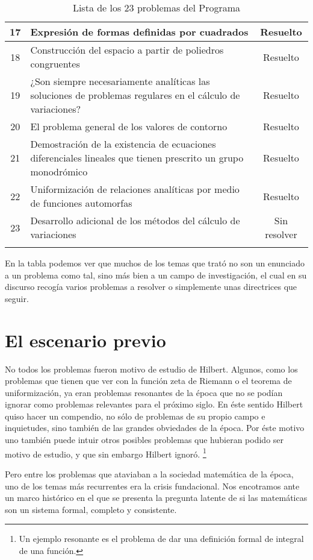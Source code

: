 \begin{longtable}{|c|p{7cm}|c|}
    17 & Expresión de formas definidas por cuadrados & Resuelto \\ \midrule
    18 & Construcción del espacio a partir de poliedros congruentes & Resuelto \\ \midrule
    19 & ¿Son siempre necesariamente analíticas las soluciones de 
        problemas regulares en el cálculo de variaciones? & Resuelto \\ \midrule
    20 & El problema general de los valores de contorno & Resuelto \\ \midrule
    21 & Demostración de la existencia de ecuaciones diferenciales
        lineales que tienen prescrito un grupo monodrómico & Resuelto \\ \midrule
    22 & Uniformización de relaciones analíticas 
        por medio de funciones automorfas & Resuelto \\ \midrule
    23 & Desarrollo adicional de los métodos del cálculo de variaciones & Sin resolver \\ \bottomrule
  \caption{Lista de los 23 problemas del Programa}
  \label{tb:programa}
\end{longtable}

En la tabla podemos ver que muchos de los temas que trató no son un enunciado a un problema como tal, sino más bien a un campo de investigación, el cual en su 
discurso recogía varios problemas a resolver o simplemente unas directrices que seguir.



\section{El escenario previo}

No todos los problemas fueron motivo de estudio de Hilbert. Algunos, como los problemas que tienen que ver con la función zeta de Riemann o el teorema de uniformización,
ya eran problemas resonantes de la época que no se podían ignorar como problemas relevantes para el próximo siglo. En éste sentido Hilbert quiso hacer un compendio, 
no sólo de problemas de su propio campo e inquietudes, sino también de las grandes obviedades de la época. Por éste motivo uno también puede intuir otros posibles problemas
que hubieran podido ser motivo de estudio, y que sin embargo Hilbert ignoró. \footnote{Un ejemplo resonante es el problema de dar una definición formal de integral de una función.}

Pero entre los problemas que ataviaban a la sociedad matemática de la época, uno de los temas más recurrentes era la crisis fundacional. Nos encotramos ante un marco histórico 
en el que se presenta la pregunta latente de si las matemáticas son un sistema formal, completo y consistente. 


